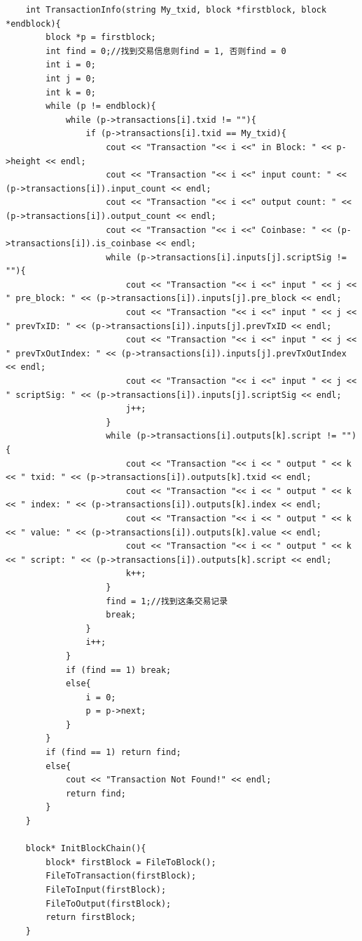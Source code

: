 \documentclass[10pt,a4paper]{article}
\begin{document}
\begin{verbatim}
    int TransactionInfo(string My_txid, block *firstblock, block *endblock){
        block *p = firstblock;
        int find = 0;//找到交易信息则find = 1, 否则find = 0
        int i = 0;
        int j = 0;
        int k = 0;
        while (p != endblock){
            while (p->transactions[i].txid != ""){
                if (p->transactions[i].txid == My_txid){
                    cout << "Transaction "<< i <<" in Block: " << p->height << endl;
                    cout << "Transaction "<< i <<" input count: " << (p->transactions[i]).input_count << endl;
                    cout << "Transaction "<< i <<" output count: " << (p->transactions[i]).output_count << endl;
                    cout << "Transaction "<< i <<" Coinbase: " << (p->transactions[i]).is_coinbase << endl;
                    while (p->transactions[i].inputs[j].scriptSig != ""){
                        cout << "Transaction "<< i <<" input " << j << " pre_block: " << (p->transactions[i]).inputs[j].pre_block << endl;
                        cout << "Transaction "<< i <<" input " << j << " prevTxID: " << (p->transactions[i]).inputs[j].prevTxID << endl;
                        cout << "Transaction "<< i <<" input " << j << " prevTxOutIndex: " << (p->transactions[i]).inputs[j].prevTxOutIndex << endl;
                        cout << "Transaction "<< i <<" input " << j << " scriptSig: " << (p->transactions[i]).inputs[j].scriptSig << endl;
                        j++;
                    }
                    while (p->transactions[i].outputs[k].script != ""){
                        cout << "Transaction "<< i << " output " << k << " txid: " << (p->transactions[i]).outputs[k].txid << endl;
                        cout << "Transaction "<< i << " output " << k << " index: " << (p->transactions[i]).outputs[k].index << endl;
                        cout << "Transaction "<< i << " output " << k << " value: " << (p->transactions[i]).outputs[k].value << endl;
                        cout << "Transaction "<< i << " output " << k << " script: " << (p->transactions[i]).outputs[k].script << endl;
                        k++;
                    }                
                    find = 1;//找到这条交易记录
                    break;
                }
                i++;
            }
            if (find == 1) break;
            else{
                i = 0;
                p = p->next;
            }
        }
        if (find == 1) return find;
        else{
            cout << "Transaction Not Found!" << endl;
            return find;
        }
    }
    
    block* InitBlockChain(){
        block* firstBlock = FileToBlock();
        FileToTransaction(firstBlock);
        FileToInput(firstBlock);
        FileToOutput(firstBlock);
        return firstBlock;
    }
    

\end{verbatim}
\end{document}
